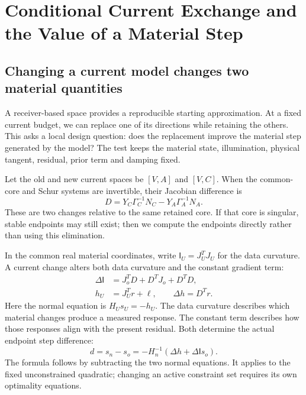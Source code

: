 \section{Conditional Current Exchange and the Value of a Material Step}
\subsection{Changing a current model changes two material quantities}
A receiver-based space provides a reproducible starting approximation. At a fixed current budget, we can replace one of its directions while retaining the others. This asks a local design question: does the replacement improve the material step generated by the model? The test keeps the material state, illumination, physical tangent, residual, prior term and damping fixed.

Let the old and new current spaces be $[V,A]$ and $[V,C]$. When the common-core and Schur systems are invertible, their Jacobian difference is
\begin{equation}\label{eq:exchange-difference}
 D=Y_C\Gamma_C^{-1}N_C-Y_A\Gamma_A^{-1}N_A.
\end{equation}
These are two changes relative to the same retained core. If that core is singular, stable endpoints may still exist; then we compute the endpoints directly rather than using this elimination.

In the common real material coordinates, write $\mathsf I_U=J_U^TJ_U$ for the data curvature. A current change alters both data curvature and the constant gradient term:
\begin{equation}\label{eq:information-offset}
\begin{aligned}
 \Delta\mathsf I&=J_o^TD+D^TJ_o+D^TD,\\
 h_U&=J_U^Tr+\ell,\qquad \Delta h=D^Tr.
\end{aligned}
\end{equation}
Here the normal equation is $H_Us_U=-h_U$. The data curvature describes which material changes produce a measured response. The constant term describes how those responses align with the present residual. Both determine the actual endpoint step difference:
\begin{equation}\label{eq:exchange-step}
 d=s_n-s_o=-H_n^{-1}(\Delta h+\Delta\mathsf I s_o).
\end{equation}
The formula follows by subtracting the two normal equations. It applies to the fixed unconstrained quadratic; changing an active constraint set requires its own optimality equations.


